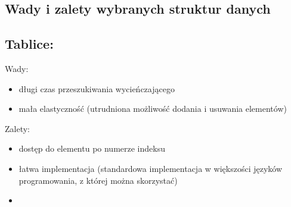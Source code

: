 \documentclass[polish,polish,a4paper]{article}
\begin{document}
\begin{spacing}{1.5}
\section{Wady i zalety wybranych struktur danych}
\subsection{Tablice:}
Wady:
\begin{itemize}
	\item długi czas przeszukiwania wycieńczającego
	\item mała elastyczność (utrudniona możliwość dodania i usuwania elementów)
\end{itemize}
Zalety:
\begin{itemize}
	\item dostęp do elementu po numerze indeksu
	\item łatwa implementacja (standardowa implementacja w większości języków programowania, z której można skorzystać)
	\item 
\end{itemize}


\end{spacing}
	\newpage
	\tableofcontents
\end{document}
